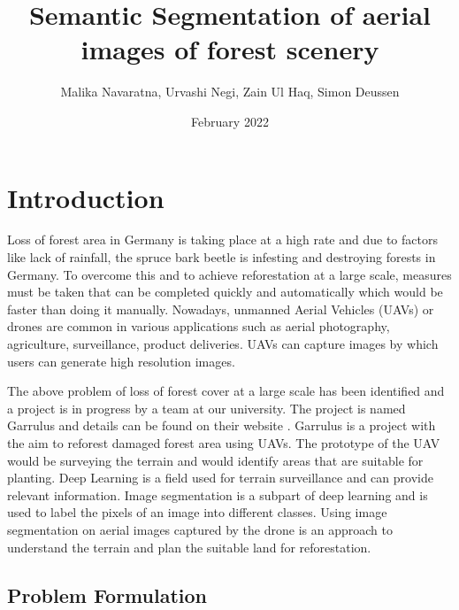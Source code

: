 \documentclass[rnd]{mas_proposal}
\title{Semantic Segmentation of aerial images of forest scenery}
\author{Malika Navaratna, Urvashi Negi, Zain Ul Haq, Simon Deussen}
\date{February 2022}
\begin{document}
\maketitle

\pagestyle{plain}
\tableofcontents
\clearpage
\section{Introduction}
Loss of forest area in Germany is taking place at a high rate and due to factors like lack of rainfall, the spruce bark beetle is infesting and destroying forests in Germany. 
To overcome this and to achieve reforestation at a large scale, measures must be taken that can be completed quickly and automatically which would be faster than doing it manually. 
Nowadays, unmanned Aerial Vehicles (UAVs) or drones are common in various applications such as aerial photography, agriculture, surveillance, product deliveries. UAVs can capture images
by which users can generate high resolution images.  

The above problem of loss of forest cover at a large scale has been identified and a project is in progress by a team at our university. The project is named Garrulus and 
details can be found on their website \cite{hbrs-garrulus}. Garrulus is a project with the aim to reforest damaged forest area using UAVs. The prototype of the UAV would be surveying the 
terrain and would identify areas that are suitable for planting. 
Deep Learning is a field used for terrain surveillance and can provide relevant information. Image segmentation is a subpart of deep learning and is used to label the pixels 
of an image into different classes. Using image segmentation on aerial images captured by the drone is an approach to understand the terrain and plan the suitable land for reforestation.


\subsection{Problem Formulation}
\end{document}
